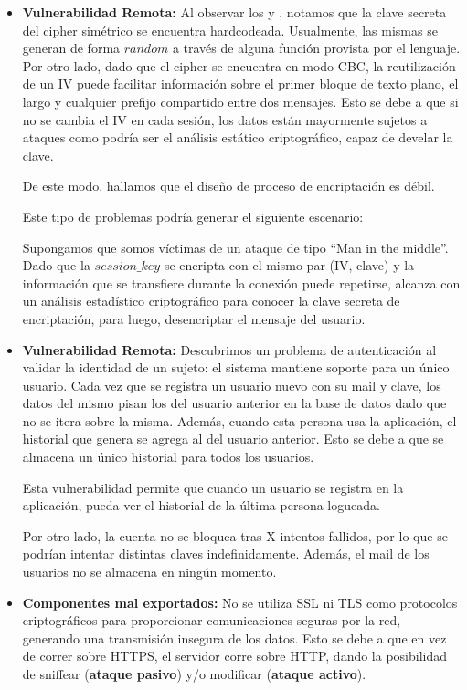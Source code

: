 \documentclass[10pt, a4paper]{article}
\begin{document}
\begin{itemize}

\item \textbf{Vulnerabilidad Remota:} Al observar los  y , notamos que la clave secreta del cipher simétrico se encuentra hardcodeada. Usualmente, las mismas se generan de forma $random$ a través de alguna función provista por el lenguaje. 
Por otro lado, dado que el cipher se encuentra en modo CBC, la reutilización de un IV puede facilitar información sobre el primer bloque de texto plano, el largo y cualquier prefijo compartido entre dos mensajes.
Esto se debe a que si no se cambia el IV en cada sesión, los datos están mayormente sujetos a ataques como podría ser el análisis estático criptográfico, capaz de develar la clave. 

De este modo, hallamos que el diseño de proceso de encriptación es débil.

Este tipo de problemas podría generar el siguiente escenario:

Supongamos que somos víctimas de un ataque de tipo ``Man in the middle''. Dado que la $session\_key$ se encripta con el mismo par (IV, clave) y la información que se transfiere durante la conexión puede repetirse, alcanza con un análisis estadístico criptográfico para conocer la clave secreta de encriptación, para luego, desencriptar el mensaje del usuario.

\item \textbf{Vulnerabilidad Remota:} Descubrimos un problema de autenticación al validar la identidad de un sujeto: el sistema mantiene soporte para un único usuario. Cada vez que se registra un usuario nuevo con su mail y clave, los datos del mismo pisan los del usuario anterior en la base de datos dado que no se itera sobre la misma. Además, cuando esta persona usa la aplicación, el historial que genera se agrega al del usuario anterior. Esto se debe a que se almacena un único historial para todos los usuarios.

Esta vulnerabilidad permite que cuando un usuario se registra en la aplicación, pueda ver el historial de la última persona logueada.

Por otro lado, la cuenta no se bloquea tras X intentos fallidos, por lo que se podrían intentar distintas claves indefinidamente. Además, el mail de los usuarios no se almacena en ningún momento. 

\item \textbf{Componentes mal exportados:} No se utiliza SSL ni TLS como protocolos criptográficos para proporcionar comunicaciones seguras por la red, generando una transmisión insegura de los datos. Esto se debe a que en vez de correr sobre HTTPS, el servidor corre sobre HTTP, dando la posibilidad de sniffear (\textbf{ataque pasivo}) y/o modificar (\textbf{ataque activo}).


\end{itemize}
\end{document}
